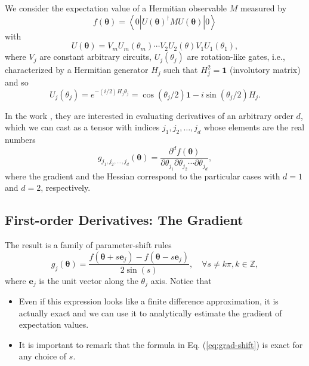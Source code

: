 \documentclass[
        11pt, %
	a4paper, %
]{LegrandOrangeBook}
\begin{document}
We consider the expectation value of a Hermitian observable $M$ measured by
\begin{equation}
    f(\boldsymbol{\theta})=\left\langle 0\left|U(\boldsymbol{\theta})^{\dagger} M U(\boldsymbol{\theta})\right| 0\right\rangle
\end{equation}
with
\begin{equation}
    U(\boldsymbol{\theta})=V_m U_m\left(\theta_m\right) \cdots V_2 U_2(\theta) V_1 U_1\left(\theta_1\right),
\end{equation}
where $V_j$ are constant arbitrary circuits, $U_j\left(\theta_j\right)$ are rotation-like gates, i.e., characterized by a Hermitian generator $H_j$ such that $H_j^2=\textbf{1}$ (involutory matrix) and so
\begin{equation}
    U_j\left(\theta_j\right)=e^{-(i / 2) H_j \theta_j}=\cos \left(\theta_j / 2\right) \textbf{1}-i \sin \left(\theta_j / 2\right) H_j .
\end{equation}

In the work \cite{crooks2019gradients}, they are interested in evaluating derivatives of an arbitrary order $d$, which we can cast as a tensor with indices $j_1, j_2, \ldots, j_d$ whose elements are the real numbers
\begin{equation}
    g_{j_1, j_2, \ldots, j_d}(\boldsymbol{\theta})=\frac{\partial^d f(\boldsymbol{\theta})}{\partial \theta_{j_1} \partial \theta_{j_2} \cdots \partial \theta_{j_d}},
\end{equation}
where the gradient and the Hessian correspond to the particular cases with $d=1$ and $d=2$, respectively.

\subsection{First-order Derivatives: The Gradient}
The result is a family of parameter-shift rules
\begin{equation}
    \label{eq:grad-shift}
g_j(\boldsymbol{\theta})=\frac{f\left(\boldsymbol{\theta}+s \mathbf{e}_j\right)-f\left(\boldsymbol{\theta}-s \mathbf{e}_j\right)}{2 \sin (s)}, \quad \forall s \neq k \pi, k \in \mathbb{Z},
\end{equation}
where $\mathbf{e}_j$ is the unit vector along the $\theta_j$ axis. Notice that 
\begin{itemize}
    \item Even if this expression looks like a finite difference approximation, it is actually exact and we can use it to analytically estimate the gradient of expectation values.
    \item It is important to remark that the formula in Eq. (\ref{eq:grad-shift}) is exact for any choice of $s$. 
\end{itemize}
\end{document}
